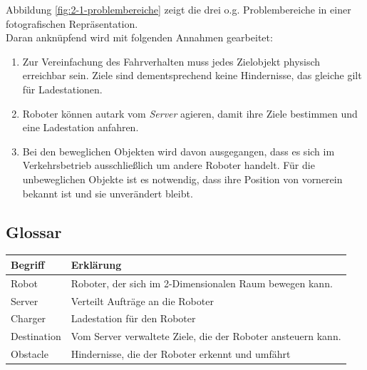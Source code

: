 \documentclass[includeheaders]{scrartcl}
\begin{document}
		Abbildung \ref{fig:2-1-problembereiche} zeigt die drei o.g. Problembereiche in einer fotografischen Repräsentation.\\


		Daran anknüpfend wird mit folgenden Annahmen gearbeitet:

		\begin{enumerate}
		\item
			Zur Vereinfachung des Fahrverhalten muss jedes Zielobjekt physisch
			erreichbar sein. Ziele sind dementsprechend keine Hindernisse, das
			gleiche gilt für Ladestationen.
		\item
			Roboter können autark vom \emph{Server} agieren, damit ihre Ziele
			bestimmen und eine Ladestation anfahren.
		\item
			Bei den beweglichen Objekten wird davon ausgegangen, dass es sich im
			Verkehrsbetrieb ausschließlich um andere Roboter handelt. Für die
			unbeweglichen Objekte ist es notwendig, dass ihre Position von
			vornerein bekannt ist und sie unverändert bleibt.
		\end{enumerate}

		\subsection{Glossar}


		\begin{table}[H]
			\centering
			\begin{tabularx}{\textwidth}{@{}p{3cm}X@{}}
				\toprule
				Begriff & Erklärung\\
				\midrule
				Robot & Roboter, der sich im 2-Dimensionalen Raum bewegen
				kann.\\
				Server & Verteilt Aufträge an die Roboter\\
				Charger & Ladestation für den Roboter\\
				Destination & Vom Server verwaltete Ziele, die der Roboter ansteuern
				kann.\\
				Obstacle & Hindernisse, die der Roboter erkennt und
				umfährt\\
				\bottomrule
			\end{tabularx}
			\label{tab:2-2-glossar}
		\end{table}
\end{document}
